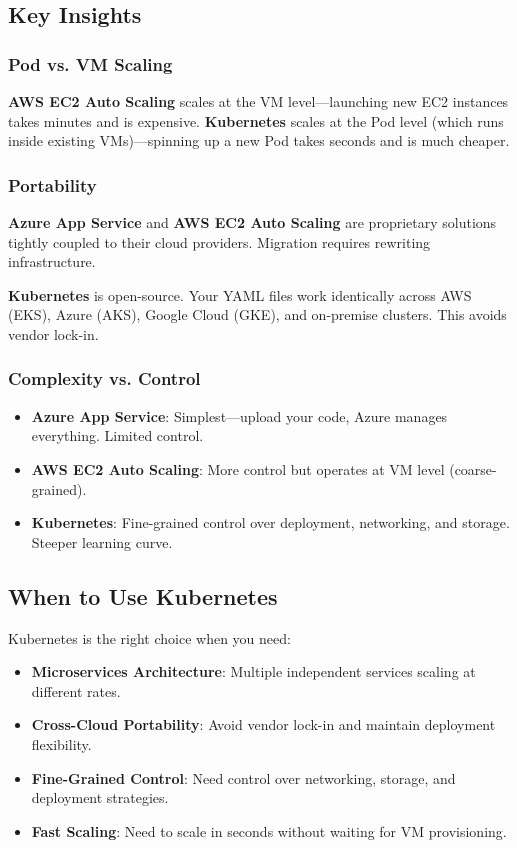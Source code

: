 \documentclass[12pt,a4paper]{article}
\begin{document}
\subsection{Key Insights}

\subsubsection{Pod vs. VM Scaling}

\textbf{AWS EC2 Auto Scaling} scales at the VM level—launching new EC2 instances takes minutes and is expensive. \textbf{Kubernetes} scales at the Pod level (which runs inside existing VMs)—spinning up a new Pod takes seconds and is much cheaper.

\subsubsection{Portability}

\textbf{Azure App Service} and \textbf{AWS EC2 Auto Scaling} are proprietary solutions tightly coupled to their cloud providers. Migration requires rewriting infrastructure.

\textbf{Kubernetes} is open-source. Your YAML files work identically across AWS (EKS), Azure (AKS), Google Cloud (GKE), and on-premise clusters. This avoids vendor lock-in.

\subsubsection{Complexity vs. Control}

\begin{itemize}
    \item \textbf{Azure App Service}: Simplest—upload your code, Azure manages everything. Limited control.
    \item \textbf{AWS EC2 Auto Scaling}: More control but operates at VM level (coarse-grained).
    \item \textbf{Kubernetes}: Fine-grained control over deployment, networking, and storage. Steeper learning curve.
\end{itemize}

\subsection{When to Use Kubernetes}

Kubernetes is the right choice when you need:

\begin{itemize}
    \item \textbf{Microservices Architecture}: Multiple independent services scaling at different rates.
    \item \textbf{Cross-Cloud Portability}: Avoid vendor lock-in and maintain deployment flexibility.
    \item \textbf{Fine-Grained Control}: Need control over networking, storage, and deployment strategies.
    \item \textbf{Fast Scaling}: Need to scale in seconds without waiting for VM provisioning.
\end{itemize}
\end{document}
